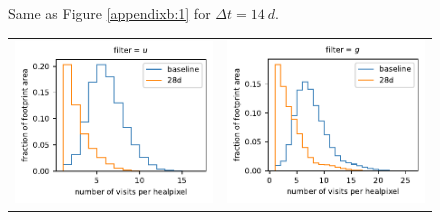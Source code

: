 \documentclass[preprintm,linenumbers]{aastex631}
\begin{document}
\begin{figure}
\begin{tabular}{@{}c@{}c@{}}
			\end{tabular}
			\caption{ Same as Figure \ref{appendixb:1} for $\Delta t = 14\ \si{d}$. \label{appendixb:3}}
		\end{figure}

        \begin{figure}
			\centering
			\begin{tabular}{@{}c@{}c@{}}
				\includegraphics{results/histograms/hist_first_year_one_snap_v4_0_10yrs_db_noDD_noTwi_CountMetric_doAllTemplateMetrics_reduceCount_u_28_noDD_noTwi.pdf} &
				 \includegraphics{results/histograms/hist_first_year_one_snap_v4_0_10yrs_db_noDD_noTwi_CountMetric_doAllTemplateMetrics_reduceCount_g_28_noDD_noTwi.pdf} \\

\end{tabular}
\end{figure}
\end{document}
